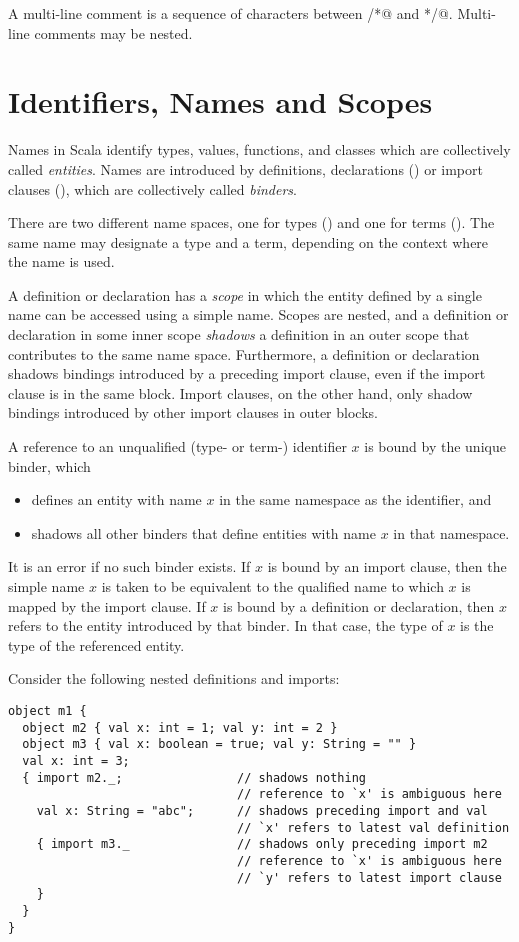 \documentclass[a4paper,12pt,twoside,titlepage]{book}
\begin{document}
A multi-line comment is a sequence of characters between \lstinline@/*@ and
\lstinline@*/@. Multi-line comments may be nested.


\chapter{\label{sec:names}Identifiers, Names and Scopes}

Names in Scala identify types, values, functions, and classes which
are collectively called {\em entities}.  Names are introduced by
definitions, declarations () or import clauses
(), which are collectively called {\em binders}.

There are two different name spaces, one for types ()
and one for terms ().  The same name may designate a
type and a term, depending on the context where the name is used.  

A definition or declaration has a {\em scope} in which the entity
defined by a single name can be accessed using a simple name. Scopes
are nested, and a definition or declaration in some inner scope {\em
shadows} a definition in an outer scope that contributes to the same
name space. Furthermore, a definition or declaration shadows bindings
introduced by a preceding import clause, even if the import clause is
in the same block. Import clauses, on the other hand, only shadow
bindings introduced by other import clauses in outer blocks.

A reference to an unqualified (type- or term-) identifier $x$ is bound
by the unique binder, which
\begin{itemize}
\item defines an entity with name $x$ in the same namespace as the
identifier, and
\item shadows all other binders that define entities with name $x$ in that namespace.
\end{itemize}
It is an error if no such binder exists.  If $x$ is bound by an import
clause, then the simple name $x$ is taken to be equivalent to the
qualified name to which $x$ is mapped by the import clause. If $x$ is bound by a definition or declaration,
then $x$ refers to the entity introduced by that
binder. In that case, the type of $x$ is the type of the referenced
entity.

\example Consider the following nested definitions and imports:

\begin{lstlisting}
object m1 {
  object m2 { val x: int = 1; val y: int = 2 }
  object m3 { val x: boolean = true; val y: String = "" }
  val x: int = 3;              
  { import m2._;                // shadows nothing
                                // reference to `x' is ambiguous here
    val x: String = "abc";      // shadows preceding import and val
                                // `x' refers to latest val definition
    { import m3._               // shadows only preceding import m2
                                // reference to `x' is ambiguous here
                                // `y' refers to latest import clause
    }
  }
} 
\end{lstlisting}
\end{document}
